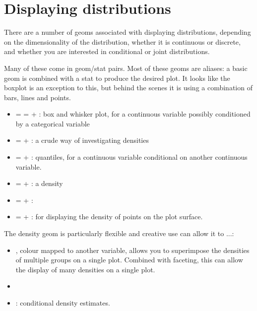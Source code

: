 \section{Displaying distributions}\label{sec:distributions}

There are a number of geoms associated with displaying distributions, depending on the dimensionality of the distribution, whether it is continuous or discrete, and whether you are interested in conditional or joint distributions.

Many of these come in geom/stat pairs.  Most of these geoms are aliases: a basic geom is combined with a stat to produce the desired plot.  It looks like the boxplot is an exception to this, but behind the scenes it is using a combination of bars, lines and points.

\begin{itemize}
	\item {} = =  + : box and whisker plot, for a continuous variable possibly conditioned by a categorical variable
	\item {} =  + : a crude way of investigating densities
	\item {} =  + : quantiles, for a continuous variable conditional on another continuous variable.
	\item {} =  + : a density
	\item {} =  + : 
	\item {} =  + : for displaying the density of points on the plot surface.
\end{itemize}

The density geom is particularly flexible and creative use can allow it to ...: 

\begin{itemize}
  \item {}, colour mapped to another variable, allows you to superimpose the densities of multiple groups on a single plot.  Combined with faceting, this can allow the display of many densities on a single plot.
  
  \item {}

  \item {}: conditional density estimates.
\end{itemize}

